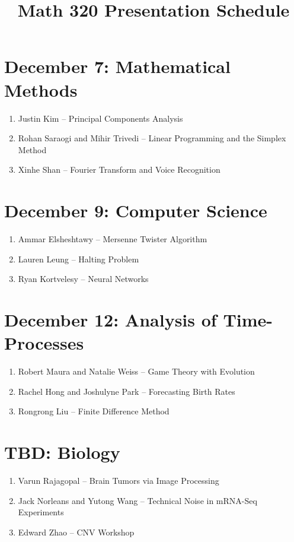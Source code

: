\documentclass[12pt]{article}
\begin{document}
\title{Math 320 Presentation Schedule}
\date{}
\maketitle

\begin{comment}
Ammar Elsheshtawy -- Mersenne Twister Algorithm
Justin Kim -- Principal Components Analysis
Ryan Kortvelesy -- Neural Networks
Lauren Leung -- Halting Problem
Rongrong Liu -- Finite Difference Method
Robert Maura and Natalie Weiss -- Game Theory
Jack Norleans and Yutong Wang -- Technical Noise in mRNA-Seq Experiments
Rachel Hong and Joshulyne Park -- Time-Series Sociology Data Analysis
Varun Rajagopal -- Brain Tumors via Image Processing
Xinhe Shan -- Fourier Transform and Voice Recognition
Rohan Saraogi and Mihir Trivedi -- Linear Programming and the Simplex Method
Edward Zhao -- CNV Workshop

\end{comment}

\section{December 7: Mathematical Methods} \begin{enumerate}
\item Justin Kim -- Principal Components Analysis
\item Rohan Saraogi and Mihir Trivedi -- Linear Programming and the Simplex Method
\item Xinhe Shan -- Fourier Transform and Voice Recognition
\end{enumerate}

\section{December 9: Computer Science} \begin{enumerate}
\item Ammar Elsheshtawy -- Mersenne Twister Algorithm
\item Lauren Leung -- Halting Problem
\item Ryan Kortvelesy -- Neural Networks
\end{enumerate}

\section{December 12: Analysis of Time-Processes} \begin{enumerate}
\item Robert Maura and Natalie Weiss -- Game Theory with Evolution
\item Rachel Hong and Joshulyne Park -- Forecasting Birth Rates
\item Rongrong Liu -- Finite Difference Method
\end{enumerate}

\section{TBD: Biology} \begin{enumerate}
\item Varun Rajagopal -- Brain Tumors via Image Processing
\item Jack Norleans and Yutong Wang -- Technical Noise in mRNA-Seq Experiments
\item Edward Zhao -- CNV Workshop
\end{enumerate}
\end{document}
